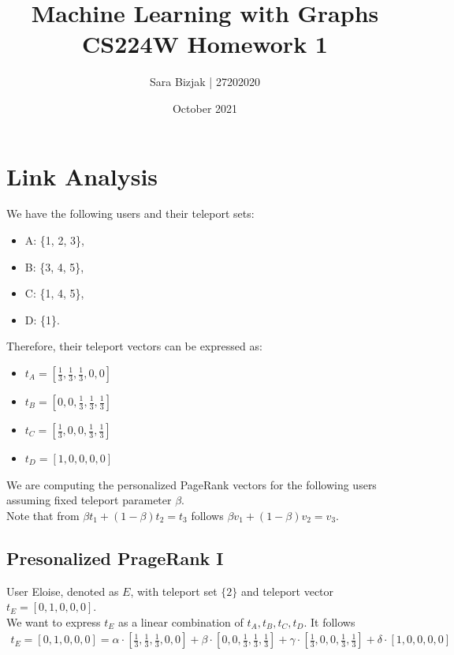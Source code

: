 \documentclass[a4paper,11pt]{article}
\title{Machine Learning with Graphs \\
\textbf{CS224W Homework 1} }
\author{Sara Bizjak  |  27202020}
\date{October 2021}
\begin{document}
\maketitle


\section{Link Analysis}

We have the following users and their teleport sets:
\begin{itemize}
    \item A: \{1, 2, 3\},
    \item B: \{3, 4, 5\},
    \item C: \{1, 4, 5\},
    \item D: \{1\}.
\end{itemize}
Therefore, their teleport vectors can be expressed as:
\begin{itemize}
    \item $t_A = [\frac{1}{3}, \frac{1}{3}, \frac{1}{3}, 0, 0]$
    \item $t_B = [0, 0, \frac{1}{3}, \frac{1}{3}, \frac{1}{3}]$
    \item $t_C = [\frac{1}{3}, 0, 0, \frac{1}{3}, \frac{1}{3}]$
    \item $t_D = [1, 0, 0, 0, 0]$
\end{itemize}
We are computing the personalized PageRank vectors for the following users assuming fixed teleport parameter $\beta$.
\\
Note that from $\beta t_1 + (1 - \beta) t_2 = t_3$ follows $\beta v_1 + (1 - \beta) v_2 = v_3$.

\subsection{Presonalized PrageRank I}

User Eloise, denoted as $E$, with teleport set $\{2\}$ and teleport vector $t_E = [0, 1, 0, 0, 0]$.
\\
We want to express $t_E$ as a linear combination of $t_A, t_B, t_C, t_D$. It follows
\\
\begin{align*}
t_E = [0, 1, 0, 0, 0] = \alpha \cdot \left[\frac{1}{3}, \frac{1}{3}, \frac{1}{3}, 0, 0 \right] 
                        + \beta \cdot \left[0, 0, \frac{1}{3}, \frac{1}{3}, \frac{1}{3}\right]
                        + \gamma \cdot \left[\frac{1}{3}, 0, 0, \frac{1}{3}, \frac{1}{3}\right]
                        + \delta \cdot \left[1, 0, 0, 0, 0\right]
\end{align*}
\end{document}
